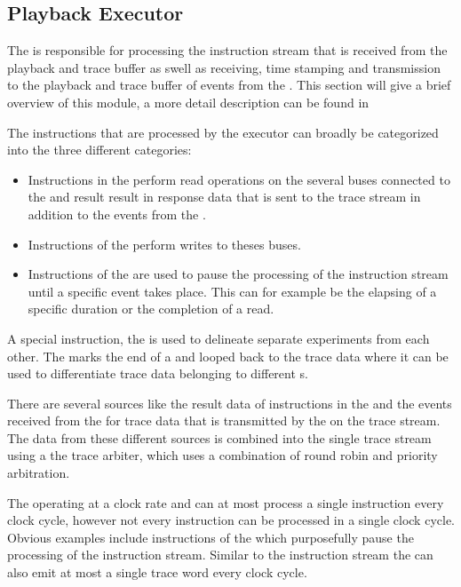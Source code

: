 \subsection{Playback Executor}
The \pbexec{} is responsible for processing the instruction stream that is received from the playback and trace buffer as swell as receiving, time stamping and transmission to the playback and trace buffer of events from the \ASIC{}. This section will give a brief overview of this module, a more detail description can be found in \autocite{ref:pb_exec}

The instructions that are processed by the executor can broadly be categorized into the three different categories:
\begin{itemize}
\item Instructions in the \readCat{} perform read operations on the several buses connected to the \pbexec{} and result result in response data that is sent to the trace stream in addition to the events from the \ASIC{}.
\item Instructions of the \writeCat{} perform writes to theses buses.
\item Instructions of the \waitCat{} are used to pause the processing of the instruction stream until a specific event takes place. This can for example be the elapsing of a specific duration or the completion of a read.
\end{itemize}
A special instruction, the \haltInstr{} is used to delineate separate experiments from each other. The \haltInstr{} marks the end of a \PlaybackProgram{} and looped back to the trace data where it can be used to differentiate trace data belonging to different \PlaybackProgram{}s.

There are several sources like the result data of instructions in the \readCat{} and the events received from the \ASIC{} for trace data that is transmitted by the \pbexec{} on the trace stream. The data from these different sources is combined into the single trace stream using a the trace arbiter, which uses a combination of round robin and priority arbitration.

The \pbexec{} operating at a \pbExecClock{} clock rate and can at most process a single instruction every clock cycle, however not every instruction can be processed in a single clock cycle. Obvious examples include instructions of the \waitCat{} which purposefully pause the processing of the instruction stream. Similar to the instruction stream the \pbexec{} can also emit at most a single trace word every clock cycle.

